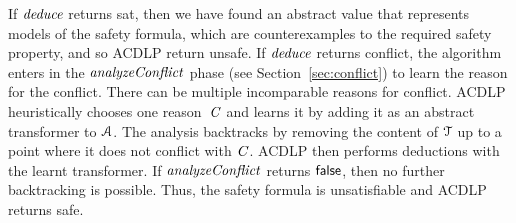 If  $\mathit{deduce}$ returns  \textsf{sat}, then we have found an abstract value 
that represents models of the safety formula, which are counterexamples 
to the required safety property, and so ACDLP return \textsf{unsafe}.
%
%
If  $\mathit{deduce}$ returns  \textsf{conflict}, 
the algorithm enters in the $\mathit{analyzeConflict}$ 
phase (see Section~\ref{sec:conflict}) to learn the reason for the conflict.   There can be multiple
incomparable reasons for conflict.
ACDLP heuristically chooses one reason~$\mathit{C}$ and learns it 
by adding it as an abstract transformer to $\mathcal{A}$. The analysis 
backtracks by removing the content of $\mathcal{T}$ up to a point where it does not 
conflict with $\mathit{C}$.  ACDLP then performs deductions with the learnt 
transformer.  If $\mathit{analyzeConflict}$ returns $\mathsf{false}$, then no further
backtracking is possible.  Thus, the safety formula is unsatisfiable
and ACDLP returns \textsf{safe}.


